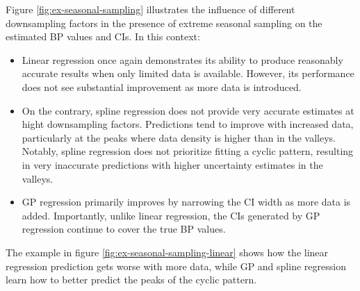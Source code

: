 Figure \ref{fig:ex-seasonal-sampling} illustrates the influence of different
downsampling factors in the presence of extreme seasonal sampling on the estimated
BP values and CIs. In this context:
\begin{itemize}
    \item Linear regression once again demonstrates its ability to produce
    reasonably accurate results when only limited data is available.
    However, its performance does not see substantial improvement as more data is introduced.
    \item On the contrary, spline regression does not provide very accurate estimates
    at hight downsampling factors.
    Predictions tend to improve with increased data, particularly at the peaks
    where data density is higher than in the valleys.
    Notably, spline regression does not prioritize fitting a cyclic pattern,
    resulting in very inaccurate predictions with higher uncertainty
    estimates in the valleys.
    \item GP regression primarily improves by narrowing the CI width as more data is added.
    Importantly, unlike linear regression, the CIs generated by GP regression continue
    to cover the true BP values.
\end{itemize}


The example in figure \ref{fig:ex-seasonal-sampling-linear} shows
how the linear regression prediction gets worse with more data, while
GP and spline regression learn how to better predict the peaks of the cyclic pattern.

